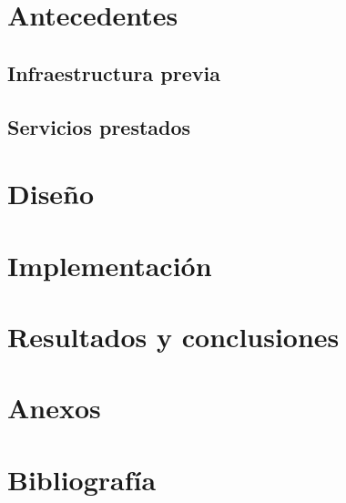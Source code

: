\documentclass[12pt,a4paper,titlepage,twoside]{report}
\begin{document}
\chapter{Antecedentes}
\section{Infraestructura previa}
\section{Servicios prestados}


\chapter{Diseño}

\chapter{Implementación}

\chapter{Resultados y conclusiones}

\chapter{Anexos}

\chapter{Bibliografía}
\nocite{*}
\printbibliography
\end{document}
